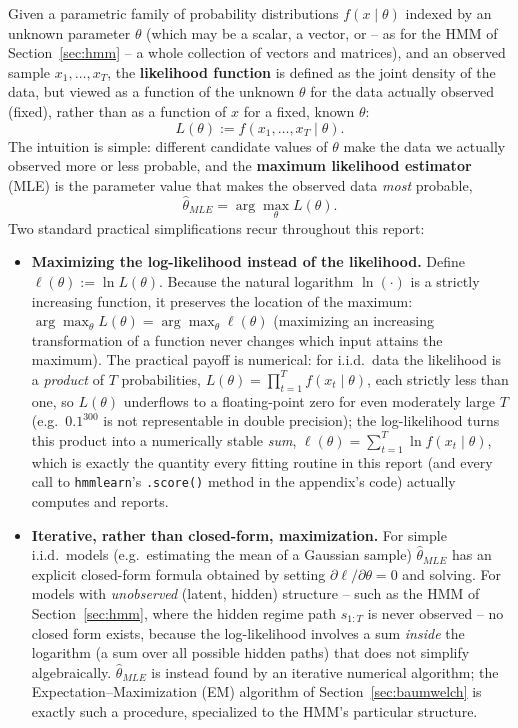 \documentclass[11pt]{article}
\theoremstyle{definition}
\theoremstyle{remark}
\begin{document}
Given a parametric family of probability distributions $f(x\mid\theta)$ indexed by an unknown parameter $\theta$ (which may be a scalar, a vector, or -- as for the HMM of Section~\ref{sec:hmm} -- a whole collection of vectors and matrices), and an observed sample $x_1,\dots,x_T$, the \textbf{likelihood function} is defined as the joint density of the data, but viewed as a function of the unknown $\theta$ for the data actually observed (fixed), rather than as a function of $x$ for a fixed, known $\theta$:
\[
L(\theta) := f(x_1,\dots,x_T\mid\theta).
\]
The intuition is simple: different candidate values of $\theta$ make the data we actually observed more or less probable, and the \textbf{maximum likelihood estimator} (MLE) is the parameter value that makes the observed data \emph{most} probable,
\[
\widehat\theta_{MLE} = \arg\max_{\theta} L(\theta).
\]
Two standard practical simplifications recur throughout this report:
\begin{itemize}
    \item \textbf{Maximizing the log-likelihood instead of the likelihood.} Define $\ell(\theta):=\ln L(\theta)$. Because the natural logarithm $\ln(\cdot)$ is a strictly increasing function, it preserves the location of the maximum: $\arg\max_\theta L(\theta)=\arg\max_\theta \ell(\theta)$ (maximizing an increasing transformation of a function never changes which input attains the maximum). The practical payoff is numerical: for i.i.d.\ data the likelihood is a \emph{product} of $T$ probabilities, $L(\theta)=\prod_{t=1}^T f(x_t\mid\theta)$, each strictly less than one, so $L(\theta)$ underflows to a floating-point zero for even moderately large $T$ (e.g.\ $0.1^{300}$ is not representable in double precision); the log-likelihood turns this product into a numerically stable \emph{sum}, $\ell(\theta)=\sum_{t=1}^T\ln f(x_t\mid\theta)$, which is exactly the quantity every fitting routine in this report (and every call to \texttt{hmmlearn}'s \texttt{.score()} method in the appendix's code) actually computes and reports.
    \item \textbf{Iterative, rather than closed-form, maximization.} For simple i.i.d.\ models (e.g.\ estimating the mean of a Gaussian sample) $\widehat\theta_{MLE}$ has an explicit closed-form formula obtained by setting $\partial\ell/\partial\theta=0$ and solving. For models with \emph{unobserved} (latent, hidden) structure -- such as the HMM of Section~\ref{sec:hmm}, where the hidden regime path $s_{1:T}$ is never observed -- no closed form exists, because the log-likelihood involves a sum \emph{inside} the logarithm (a sum over all possible hidden paths) that does not simplify algebraically. $\widehat\theta_{MLE}$ is instead found by an iterative numerical algorithm; the Expectation--Maximization (EM) algorithm of Section~\ref{sec:baumwelch} is exactly such a procedure, specialized to the HMM's particular structure.
\end{itemize}
\end{document}

